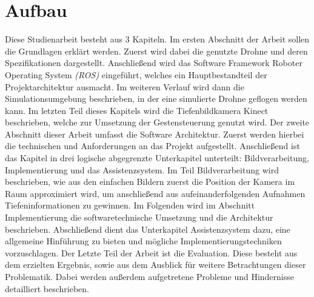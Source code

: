 \section{Aufbau}
Diese Studienarbeit besteht aus 3 Kapiteln. Im ersten Abschnitt der Arbeit sollen die Grundlagen erklärt werden. Zuerst wird dabei die genutzte Drohne und deren Spezifikationen dargestellt. \newline
Anschließend wird das Software Framework Roboter Operating System \emph{(ROS)} eingeführt, welches ein Hauptbestandteil der Projektarchitektur ausmacht.\newline
Im weiteren Verlauf wird dann die Simulationsumgebung beschrieben, in der eine simulierte Drohne geflogen werden kann.
Im letzten Teil dieses Kapitels wird die Tiefenbildkamera Kinect beschrieben, welche zur Umsetzung der Gestensteuerung genutzt wird. \newline
Der zweite Abschnitt dieser Arbeit umfasst die Software Architektur. Zuerst werden hierbei die technischen und Anforderungen an das Projekt aufgestellt. Anschließend ist das Kapitel in drei logische abgegrenzte Unterkapitel unterteilt: Bildverarbeitung, Implementierung und das Assistenzsystem. \newline
Im Teil Bildverarbeitung wird beschrieben, wie aus den einfachen Bildern zuerst die Position der Kamera im Raum approximiert wird, um anschließend aus aufeinanderfolgenden Aufnahmen Tiefeninformationen zu gewinnen. \newline
Im Folgenden wird im Abschnitt Implementierung die softwaretechnische Umsetzung und die Architektur beschrieben. Abschließend dient das Unterkapitel Assistenzsystem dazu, eine allgemeine Hinführung zu bieten und mögliche Implementierungstechniken vorzuschlagen. \newline
Der Letzte Teil der Arbeit ist die Evaluation. Diese besteht aus dem erzielten Ergebnis, sowie aus dem Ausblick für weitere Betrachtungen dieser Problematik. Dabei werden außerdem aufgetretene Probleme und Hindernisse detailliert beschrieben.

